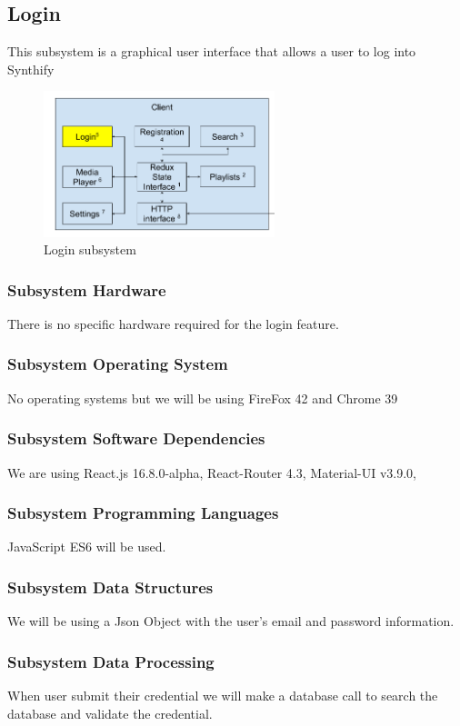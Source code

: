 \subsection{Login}
This subsystem is a graphical user interface that allows a user to log into Synthify

\begin{figure}[h!]
	\centering
 	\includegraphics[width=0.60\textwidth]{images/client/client_login.png}
 	\caption{Login subsystem}
\end{figure}

\subsubsection{Subsystem Hardware}
There is no specific hardware required for the login feature.

\subsubsection{Subsystem Operating System}
No operating systems but we will be using FireFox 42 and Chrome 39

\subsubsection{Subsystem Software Dependencies}
We are using React.js 16.8.0-alpha, React-Router 4.3, Material-UI v3.9.0, 

\subsubsection{Subsystem Programming Languages}
JavaScript ES6 will be used.

\subsubsection{Subsystem Data Structures}
We will be using a Json Object with the user's email and password information.

\subsubsection{Subsystem Data Processing}
When user submit their credential we will make a database call to search the database and validate the credential.

\newpage
